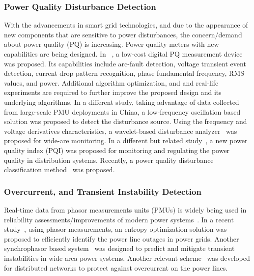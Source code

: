 \subsubsection{Power Quality Disturbance Detection}
With the advancements in smart grid technologies, and due to the appearance of new components that are sensitive to power disturbances, the concern/demand about power quality (PQ) is increasing. Power quality meters with new capabilities are being designed. In ~\cite{koziy2013low}, a low-cost digital PQ measurement device was proposed. Its capabilities include arc-fault detection, voltage transient event detection, current drop pattern recognition, phase fundamental frequency, RMS values, and
power. Additional algorithm optimization, and and real-life experiments are required to further improve the proposed design and its underlying algorithms. In a different study, taking advantage of data collected from large-scale PMU deployments in China, a low-frequency oscillation based solution \cite{ma2010application} was proposed to detect the disturbance source. Using the frequency and voltage derivatives characteristics, a wavelet-based disturbance analyzer~\cite{gao2011wavelet} was proposed for wide-are monitoring. In a different but related study~\cite{jo2013improving}, a new power quality index (PQI) was proposed for monitoring and regulating the power quality in distribution systems. Recently, a power quality disturbance classification method~\cite{liu2015classification} was proposed.

\subsubsection{Overcurrent, and Transient Instability Detection}
Real-time data from phasor measurements units (PMUs) is widely being used in reliability assessments/improvements of modern power systems~\cite{russell2010intelligent}. In a recent study~\cite{chen2014efficient}, using phasor measurements, an entropy-optimization solution was proposed to efficiently identify the power line outages in power grids. Another synchrophasor based system~\cite{hashiesh2012intelligent} was designed to predict and mitigate transient instabilities in wide-area power systems. Another relevant scheme~\cite{coffele2015adaptive} was developed for distributed networks to protect against overcurrent on the power lines.


